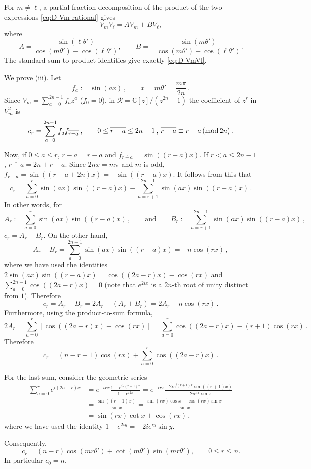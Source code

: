 \documentclass[a4paper,reqno]{amsart}
\theoremstyle{plain} %
\theoremstyle{definition} %
\theoremstyle{remark} %
\newcommand{\C}{\mathbb{C}}
\newcommand{\cR}{{\mathcal R}}
\newcommand{\1}{\mathds{1}}   %
\begin{document}
For \(m\ne\ell\), a partial-fraction decomposition of the
product of the two expressions
\eqref{eq:D-Vm-rational} gives
\[
V_mV_\ell=AV_m+BV_\ell,
\]
where
\[
A
=
\frac{\sin(\ell\theta')}
     {\cos(m\theta')-\cos(\ell\theta')},
\qquad
B
=
-\frac{\sin(m\theta')}
      {\cos(m\theta')-\cos(\ell\theta')}.
\]
The standard sum-to-product identities give exactly
\eqref{eq:D-VmVl}.

We prove (iii). Let 
\[
f_a := \sin (ax) \, , \qquad x=m\theta' = \frac{m\pi}{2n} \, .
\]
Since $V_m = \sum_{a=0}^{2n-1}f_az^a$ ($f_0=0$), in $\cR =\C[z]/(z^{2n}-1)$ the coefficient of $z^r$ in $V_m^2$ is
\[
c_r = \sum_{a=0}^{2n-1}f_af_{\overline{r-a}} \, , \qquad 0\le \overline{r-a} \le 2n-1 \, , \, \overline{r-a} \equiv r-a \,  ({\rm mod} \, 2n) \, .
\]

Now, if $0\le a \le r$, $\overline{r-a} = r-a$ and $f_{\overline{r-a}}= \sin ((r-a)x)$. If $r<a\le 2n-1$, $\overline{r-a} = 2n +r-a$.
Since \(2nx=m\pi\) and \(m\) is odd, $f_{\overline{r-a}} =\sin((r-a+2n)x) =-\sin((r-a)x)$.
It follows from this that
\[
c_r = \sum_{a=0}^{r} \sin(ax)\sin ((r-a)x) - \sum_{a=r+1}^{2n-1} \sin(ax)\sin ((r-a)x) \, .
\]
In other words, for 
\[
A_r := \sum_{a=0}^{r} \sin(ax)\sin ((r-a)x) \, , \qquad \mbox{and} \qquad B_r:= \sum_{a=r+1}^{2n-1} \sin(ax)\sin ((r-a)x) \, ,
\]
$c_r= A_r - B_r$. On the other hand, 
\[
A_r + B_r = \sum_{a=0}^{2n-1} \sin(ax)\sin ((r-a)x) = -n\cos (rx) \, ,
\]
where we have used the identities $2\sin (ax)\sin ((r-a)x) = \cos ((2a-r)x) - \cos (rx)$
and $\sum_{a=0}^{2n-1}\cos ((2a-r)x) =0$ (note that $e^{2ix}$ is a $2n$-th root of  unity distinct from $1$).
Therefore
\[
c_r = A_r - B_r = 2A_r- (A_r + B_r) = 2A_r + n\cos (rx) \, .
\]
Furthermore, using the product-to-sum formula, 
\[
2A_r = \sum_{a=0}^r [\cos ((2a-r)x) - \cos (rx)] = \sum_{a=0}^r \cos ((2a-r)x) - (r+1) \cos (rx) \, .
\]
Therefore
\[
c_r = (n-r-1)\cos (rx) +\sum_{a=0}^r \cos ((2a-r)x) \, .
\]


For the last sum, consider the geometric series
\begin{align*}
\sum_{a=0}^r e^{i(2a-r)x} & = e^{-irx}\frac{1-e^{i2(r+1)x}}{1-e^{i2x}} =e^{-irx} \frac{-2ie^{i(r+1)x}\sin((r+1)x)}{-2ie^{ix}\sin x} \\
&= \frac{\sin((r+1)x)}{\sin x} = \frac{\sin (rx)\cos x + \cos (rx) \sin x}{\sin x}  \\
&= \sin (rx) \cot x + \cos (rx) \, , 
\end{align*}
where we have used the identity $1-e^{2iy} =-2ie^{iy} \sin y$.

Consequently,
\begin{equation}\label{eq:D-cr}
c_r
=
(n-r)\cos(mr\theta')
+
\cot(m\theta')\sin(mr\theta'),
\qquad
0\le r\le n.
\end{equation}
In particular $c_0=n$. 
\end{document}
